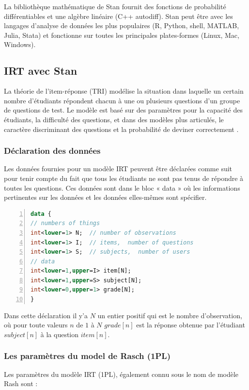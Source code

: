 La bibliothèque mathématique de Stan fournit des fonctions de probabilité différentiables et une algèbre linéaire (C++ autodiff).
Stan peut être avec les langages d'analyse de données les plus populaires (R, Python, shell, MATLAB, Julia, Stata) et fonctionne sur toutes les principales plates-formes (Linux, Mac, Windows).

\subsection{IRT avec Stan}
La théorie de l'item-réponse (TRI) modélise la situation dans laquelle un certain nombre d'étudiants répondent chacun à une ou plusieurs questions d'un groupe de questions de test. Le modèle est basé sur des paramètres pour la capacité des étudiants, la difficulté des questions, et dans des modèles plus articulés, le caractère discriminant des questions et la probabilité de deviner correctement \cite{data_analysis_irt}.

\subsubsection{Déclaration des données}
Les données fournies pour un modèle IRT peuvent être déclarées comme suit pour tenir compte du fait que tous les étudiants ne sont pas tenus de répondre à toutes les questions. Ces données sont dans le bloc « data » où les informations pertinentes sur les données et les données elles-mêmes sont spécifier.

\newpage
\begin{lstlisting}[language=Stan,basicstyle=\scriptsize, frame=l,framesep=4.5mm,framexleftmargin=2.5mm,tabsize=2,numbers=left,fillcolor=\color{blueforest!40},rulecolor=\color{blue},numberstyle=\normalfont\tiny\color{white}]
data {
// numbers of things
int<lower=1> N;  // number of observations
int<lower=1> I;  // items,  number of questions  
int<lower=1> S;  // subjects,  number of users 
// data
int<lower=1,upper=I> item[N];
int<lower=1,upper=S> subject[N];
int<lower=0,upper=1> grade[N];
}
\end{lstlisting}
Dans cette déclaration il y’a \(\displaystyle N \) un entier positif qui est le nombre d’observation, où pour toute valeurs \(\displaystyle n \) de \(\displaystyle 1 \) à \(\displaystyle N \) \(\displaystyle grade[n] \) est la réponse obtenue par l’étudiant \(\displaystyle subject[n] \) à la question \(\displaystyle item[n] \).

\subsubsection{Les paramètres du model de Rasch (1PL)}
Les paramètres du modèle IRT (1PL), également connu sous le nom de modèle Rash sont :

